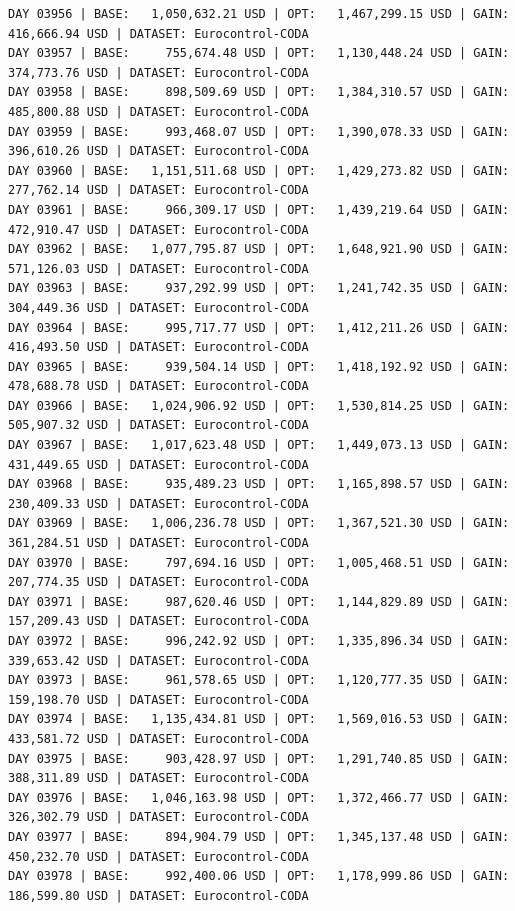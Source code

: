 \documentclass[11pt,a4paper]{article}
\begin{document}
\begin{verbatim}
DAY 03956 | BASE:   1,050,632.21 USD | OPT:   1,467,299.15 USD | GAIN: 416,666.94 USD | DATASET: Eurocontrol-CODA
DAY 03957 | BASE:     755,674.48 USD | OPT:   1,130,448.24 USD | GAIN: 374,773.76 USD | DATASET: Eurocontrol-CODA
DAY 03958 | BASE:     898,509.69 USD | OPT:   1,384,310.57 USD | GAIN: 485,800.88 USD | DATASET: Eurocontrol-CODA
DAY 03959 | BASE:     993,468.07 USD | OPT:   1,390,078.33 USD | GAIN: 396,610.26 USD | DATASET: Eurocontrol-CODA
DAY 03960 | BASE:   1,151,511.68 USD | OPT:   1,429,273.82 USD | GAIN: 277,762.14 USD | DATASET: Eurocontrol-CODA
DAY 03961 | BASE:     966,309.17 USD | OPT:   1,439,219.64 USD | GAIN: 472,910.47 USD | DATASET: Eurocontrol-CODA
DAY 03962 | BASE:   1,077,795.87 USD | OPT:   1,648,921.90 USD | GAIN: 571,126.03 USD | DATASET: Eurocontrol-CODA
DAY 03963 | BASE:     937,292.99 USD | OPT:   1,241,742.35 USD | GAIN: 304,449.36 USD | DATASET: Eurocontrol-CODA
DAY 03964 | BASE:     995,717.77 USD | OPT:   1,412,211.26 USD | GAIN: 416,493.50 USD | DATASET: Eurocontrol-CODA
DAY 03965 | BASE:     939,504.14 USD | OPT:   1,418,192.92 USD | GAIN: 478,688.78 USD | DATASET: Eurocontrol-CODA
DAY 03966 | BASE:   1,024,906.92 USD | OPT:   1,530,814.25 USD | GAIN: 505,907.32 USD | DATASET: Eurocontrol-CODA
DAY 03967 | BASE:   1,017,623.48 USD | OPT:   1,449,073.13 USD | GAIN: 431,449.65 USD | DATASET: Eurocontrol-CODA
DAY 03968 | BASE:     935,489.23 USD | OPT:   1,165,898.57 USD | GAIN: 230,409.33 USD | DATASET: Eurocontrol-CODA
DAY 03969 | BASE:   1,006,236.78 USD | OPT:   1,367,521.30 USD | GAIN: 361,284.51 USD | DATASET: Eurocontrol-CODA
DAY 03970 | BASE:     797,694.16 USD | OPT:   1,005,468.51 USD | GAIN: 207,774.35 USD | DATASET: Eurocontrol-CODA
DAY 03971 | BASE:     987,620.46 USD | OPT:   1,144,829.89 USD | GAIN: 157,209.43 USD | DATASET: Eurocontrol-CODA
DAY 03972 | BASE:     996,242.92 USD | OPT:   1,335,896.34 USD | GAIN: 339,653.42 USD | DATASET: Eurocontrol-CODA
DAY 03973 | BASE:     961,578.65 USD | OPT:   1,120,777.35 USD | GAIN: 159,198.70 USD | DATASET: Eurocontrol-CODA
DAY 03974 | BASE:   1,135,434.81 USD | OPT:   1,569,016.53 USD | GAIN: 433,581.72 USD | DATASET: Eurocontrol-CODA
DAY 03975 | BASE:     903,428.97 USD | OPT:   1,291,740.85 USD | GAIN: 388,311.89 USD | DATASET: Eurocontrol-CODA
DAY 03976 | BASE:   1,046,163.98 USD | OPT:   1,372,466.77 USD | GAIN: 326,302.79 USD | DATASET: Eurocontrol-CODA
DAY 03977 | BASE:     894,904.79 USD | OPT:   1,345,137.48 USD | GAIN: 450,232.70 USD | DATASET: Eurocontrol-CODA
DAY 03978 | BASE:     992,400.06 USD | OPT:   1,178,999.86 USD | GAIN: 186,599.80 USD | DATASET: Eurocontrol-CODA

\end{verbatim}
\end{document}
